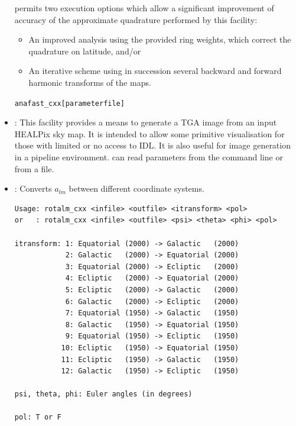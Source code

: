 \begin{itemize}
 permits two execution options which allow a significant
improvement of accuracy of the approximate quadrature performed by
this facility:

\begin{itemize}

\item An improved analysis using the provided ring weights, which
correct the quadrature on latitude, and/or

\item An iterative scheme using in succession several backward and
forward harmonic transforms of the maps.

\end{itemize}

\begin{alltt}
anafast_cxx [parameter file]


\end{alltt}

\item {}: This facility provides a means to
generate a TGA image from an input HEALPix sky map. It is intended to
allow some primitive visualisation for those with limited or no access
to IDL.  It is also useful for image generation in a pipeline
environment.  can read parameters from the command line or
from a file.

\begin{alltt}

\end{alltt}

\item {}: Converts $a_{lm}$ between different coordinate systems.

\begin{verbatim}
Usage: rotalm_cxx <infile> <outfile> <itransform> <pol>
or   : rotalm_cxx <infile> <outfile> <psi> <theta> <phi> <pol>

itransform: 1: Equatorial (2000) -> Galactic   (2000)
            2: Galactic   (2000) -> Equatorial (2000)
            3: Equatorial (2000) -> Ecliptic   (2000)
            4: Ecliptic   (2000) -> Equatorial (2000)
            5: Ecliptic   (2000) -> Galactic   (2000)
            6: Galactic   (2000) -> Ecliptic   (2000)
            7: Equatorial (1950) -> Galactic   (1950)
            8: Galactic   (1950) -> Equatorial (1950)
            9: Equatorial (1950) -> Ecliptic   (1950)
           10: Ecliptic   (1950) -> Equatorial (1950)
           11: Ecliptic   (1950) -> Galactic   (1950)
           12: Galactic   (1950) -> Ecliptic   (1950)

psi, theta, phi: Euler angles (in degrees)

pol: T or F
\end{verbatim}
\end{itemize}

